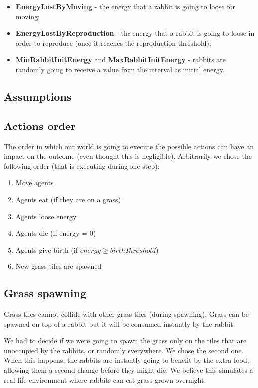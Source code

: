 \documentclass[11pt]{article}
\begin{document}
\begin{itemize}
\item \textbf{EnergyLostByMoving} - the energy that a rabbit is going to loose for moving;
\item \textbf{EnergyLostByReproduction} - the energy that a rabbit is going to loose in order to reproduce (once it reaches the reproduction threshold);
\item \textbf{MinRabbitInitEnergy} and \textbf{MaxRabbitInitEnergy} - rabbits are randomly going to receive a value from the interval as initial energy.
\end{itemize}

\subsection{Assumptions}

\subsection* {Actions order}
The order in which our world is going to execute the possible actions can have an impact on the outcome (even thought this is negligible). Arbitrarily we chose the following order (that is executing during one step):

\begin{enumerate}
\item  Move agents
\item  Agents eat (if they are on a grass)
\item  Agents loose energy
\item  Agents die (if energy = 0)
\item  Agents give birth (if $energy \geq birthThreshold$)
\item  New grass tiles are spawned
\end{enumerate}

\subsection* {Grass spawning}

Grass tiles cannot collide with other grass tiles (during spawning). Grass can be spawned on top of a rabbit but it will be consumed instantly by the rabbit.

We had to decide if we were going to spawn the grass only on the tiles that are unoccupied by the rabbits, or randomly everywhere. We chose the second one. When this happens, the rabbits are instantly going to benefit by the extra food, allowing them a second change before they might die. We believe this simulates a real life environment where rabbits can eat grass grown overnight.
\end{document}
